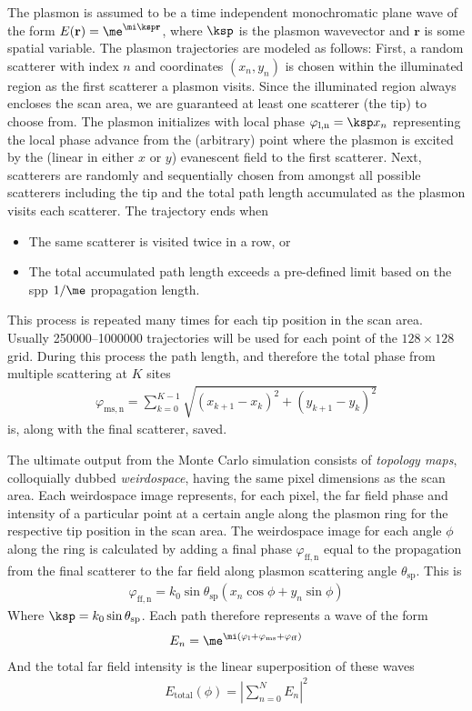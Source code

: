 The plasmon is assumed to be a time independent monochromatic plane wave
of the form $E(\mathbf{r})=\me^{\mi \ksp\mathbf{r}}$, where
$\ksp$ is the plasmon wavevector and $\mathbf{r}$ is some
spatial variable.  The plasmon trajectories are modeled as follows:
First, a random scatterer with index $n$ and coordinates $(x_n,y_n)$ is
chosen within the illuminated region as the first scatterer a plasmon
visits.  Since the illuminated region always encloses the scan area, we are
guaranteed at least one scatterer (the tip) to choose from.  The plasmon
initializes with local phase $\varphi_\mathrm{l,n}=\ksp x_n$
representing the local phase advance from the (arbitrary) point where the
plasmon is excited by the (linear in either $x$ or $y$) evanescent field to
the first scatterer.  Next, scatterers are randomly and sequentially chosen
from amongst all possible scatterers including the tip and the total path
length accumulated as the plasmon visits each scatterer.  The trajectory
ends when
\begin{itemize}
  \item The same scatterer is visited twice in a row, or
  \item The total accumulated path length exceeds a pre-defined limit based
        on the \gls{spp} $1/\me$ propagation length.
\end{itemize}
This process is repeated many times for each tip position in the scan area.
Usually \numrange{250000}{1000000} trajectories will be used for each point
of the $128\times128$ grid.  During this process the path length, and
therefore the total phase from multiple scattering at $K$ sites
\begin{align}
  \varphi_\mathrm{ms,n}=\sum_{k=0}^{K-1}\sqrt{{(x_{k+1}-x_k)}^2+{(y_{k+1}-y_k)}^2}
\end{align}
is, along with the final scatterer, saved.

The ultimate output from the Monte Carlo simulation consists of {\it
    topology maps}, colloquially dubbed \textit{weirdospace}, having the same pixel
dimensions as the scan area.  Each weirdospace image represents, for each
pixel, the far field phase and intensity of a particular point at a certain
angle along the plasmon ring for the respective tip position in the scan
area.  The weirdospace image for each angle $\phi$ along the ring is
calculated by adding a final phase $\varphi_\mathrm{ff,n}$ equal to the
propagation from the final scatterer to the far field along plasmon
scattering angle $\theta_\mathrm{sp}$.  This is
\begin{align}
  \varphi_\mathrm{ff,n} = k_0 \sin
  \theta_\mathrm{sp}\left(x_n\cos\phi+y_n\sin\phi\right)
\end{align}
Where $\ksp=k_0\sin \theta_\mathrm{sp}$.  Each path therefore
represents a wave of the form
\begin{align}
  E_n=\me^{\mi(\varphi_\mathrm{l}+\varphi_\mathrm{ms}+\varphi_\mathrm{ff})}
\end{align}
And the total far field intensity is the linear superposition of these
waves
\begin{align}
  E_\mathrm{total}(\phi) =
  \left|\sum_{n=0}^{N} E_n\right|^2
\end{align}

